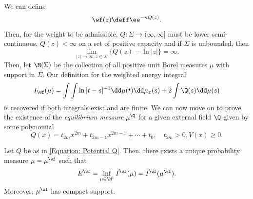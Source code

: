 We can define
\begin{equation}
	\wf(z) \deff \ee^{-n Q(z)}.
\end{equation}
Then, for the weight to be admissible, $Q : \Sigma \rightarrow (\infty, \infty]$ must be lower semi-continuous, $Q(z) < \infty$ on a set of positive capacity and if $\Sigma$ is unbounded, then
\begin{equation}
	\lim_{|z| \rightarrow \infty, z \in \Sigma} \{ Q(z) - \ln |z| \} = \infty.
\end{equation}
Then, let $\M(\Sigma)$ be the collection of all positive unit Borel measures $\mu$ with support in $\Sigma$. Our definition for the weighted energy integral
\begin{equation}
	I_\wf(\mu) = \int \int \ln |t - s|^{-1} \dd \mu(t) \dd \mu_x(s) + 2 \int \Q(s) \dd  \mu(s)
\end{equation}
is recovered if both integrals exist and are finite. We can now move on to prove the existence of the \textit{equilibrium measure} $\mu^{\Q}$ for a given external field $\Q$ given by some polynomial
\begin{equation}
	Q(x) = t_{2m} x^{2m} + t_{2m-1} x^{2m - 1} + \cdots + t_0, \quad t_{2m} > 0, V(x) \geq 0.
	\label{Equation: Potential Q}
\end{equation}

\begin{teorema} \cite{deiftorthogonal}
	Let $Q$ be as in \autoref{Equation: Potential Q}. Then, there exists a unique probability measure $\mu = \mu^{\wf}$ such that
	\begin{equation}
		E^{\wf} = \inf_{\mu \in \M^1} I^{\wf}(\mu) = I^{\wf}(\mu^{\wf}).
	\end{equation}
	Moreover, $\mu^\wf$ has compact support.
	\label{Theorem: existence equilibrium}
\end{teorema}


